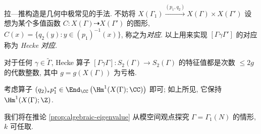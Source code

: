 拉---推构造是几何中极常见的手法. 不妨将 $X(\Gamma_1) \xrightarrow{(p_1, q_2)} X(\Gamma) \times X(\Gamma')$ 设想为某个多值函数 $C: X(\Gamma) \dashrightarrow X(\Gamma')$ 的图形, $C(x) = \{q_2(y): y \in (p_1)^{-1}(x) \}$, 称之为\emph{对应}. 以上用来实现 $[\Gamma\gamma\Gamma']$ 的对应称为 \emph{Hecke 对应}. 

\begin{exercise}
	对于任何 $\gamma \in \widetilde{\Gamma}$, Hecke 算子 $[\Gamma\gamma\Gamma]: S_2(\Gamma) \to S_2(\Gamma)$ 的特征值都是次数 $\leq 2g$ 的代数整数, 其中 $g = g(X(\Gamma))$ 为亏格.

	\begin{hint}
		考虑算子 $(q_2)_* p_1^* \in \End_{\CC}\left(\Hm^1(X(\Gamma); \CC) \right)$ 即可; 如上所见, 它保持 $\Hm^1(X(\Gamma); \Z)$.
	\end{hint}
\end{exercise}

我们将在推论 \ref{prop:algebraic-eigenvalue} 从模空间观点探究 $\Gamma = \Gamma_1(N)$ 的情形, $k$ 可任取.
